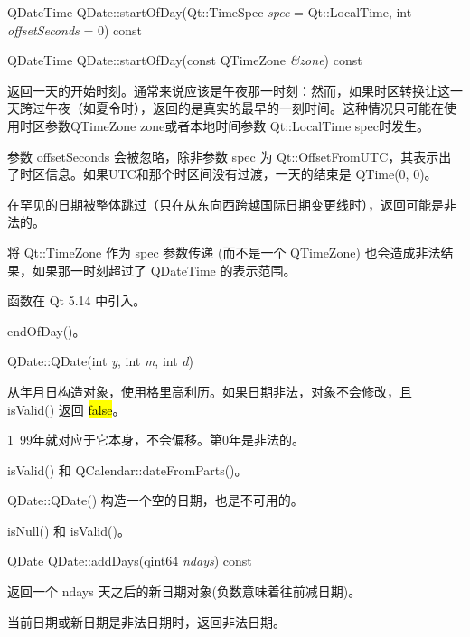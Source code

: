 \splitLine

QDateTime QDate::startOfDay(Qt::TimeSpec \emph{spec} = Qt::LocalTime, int \emph{offsetSeconds} = 0) const

QDateTime QDate::startOfDay(const QTimeZone \emph{\&zone}) const

返回一天的开始时刻。通常来说应该是午夜那一时刻：然而，如果时区转换让这一天跨过午夜（如夏令时），返回的是真实的最早的一刻时间。这种情况只可能在使用时区参数QTimeZone zone或者本地时间参数 Qt::LocalTime spec时发生。

参数 offsetSeconds 会被忽略，除非参数 spec 为 Qt::OffsetFromUTC，其表示出了时区信息。如果UTC和那个时区间没有过渡，一天的结束是 QTime(0, 0)。

在罕见的日期被整体跳过（只在从东向西跨越国际日期变更线时），返回可能是非法的。

将 Qt::TimeZone 作为 spec 参数传递 (而不是一个 QTimeZone) 也会造成非法结果，如果那一时刻超过了 QDateTime 的表示范围。

函数在 Qt 5.14 中引入。

\begin{notice}[另请参阅]
endOfDay()。
\end{notice}

\splitLine

QDate::QDate(int \emph{y}, int \emph{m}, int \emph{d})

从年月日构造对象，使用格里高利历。如果日期非法，对象不会修改，且 isValid() 返回 \hl{false}。


\begin{notice}
1~99年就对应于它本身，不会偏移。第0年是非法的。
\end{notice}


\begin{notice}[另请参阅]
isValid() 和 QCalendar::dateFromParts()。
\end{notice}



\splitLine

QDate::QDate()
构造一个空的日期，也是不可用的。


\begin{notice}[另请参阅]
isNull() 和 isValid()。
\end{notice}

\splitLine

QDate QDate::addDays(qint64 \emph{ndays}) const

返回一个 ndays 天之后的新日期对象(负数意味着往前减日期)。

当前日期或新日期是非法日期时，返回非法日期。



